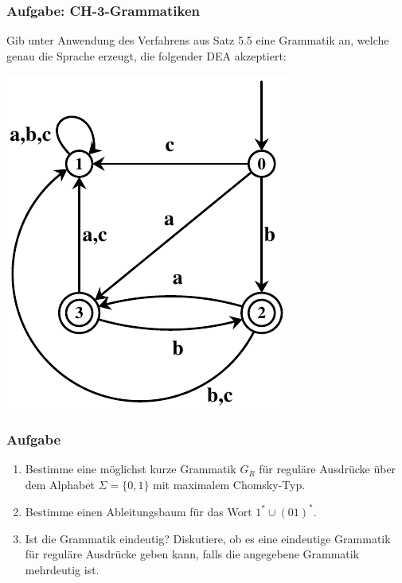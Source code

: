 \begin{frame}
\frametitle{Aufgabe: CH-3-Grammatiken}
Gib unter Anwendung des Verfahrens aus Satz 5.5 eine Grammatik an,
welche genau die Sprache erzeugt, die folgender DEA akzeptiert:

\begin{center}\includegraphics[scale=0.8]{./images/dea1.pdf}\end{center}
\end{frame}


\begin{frame}
\frametitle{Aufgabe}
\begin{enumerate}
\item Bestimme eine möglichst kurze Grammatik $G_R$ für reguläre Ausdrücke über dem Alphabet $\Sigma = \{0,1\}$ mit maximalem Chomsky-Typ.
\item Bestimme einen Ableitungsbaum für das Wort $1^* \cup (01)^*$. 
\item Ist die Grammatik eindeutig? Diskutiere, ob es eine eindeutige Grammatik für reguläre Ausdrücke geben kann, falls die angegebene Grammatik mehrdeutig ist.
\end{enumerate}
\end{frame}



